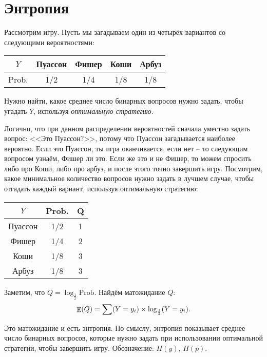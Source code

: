 \documentclass[10pt, a4paper]{extarticle}
\let\P\relax
\DeclareMathOperator{\P}{\mathbb{P}}
\DeclareMathOperator{\E}{\mathbb{E}}
\begin{document}
\hypertarget{entropy}{}
\section{Энтропия}
Рассмотрим игру. Пусть мы загадываем один из четырёх вариантов со следующими вероятностями:

\begin{center}
	\bgroup
	\def\arraystretch{1.5}
	\hspace*{-1.2cm}\begin{tabular}{ c| c c c c}
		$Y$ & Пуассон & Фишер & Коши & Арбуз \\
		\hline
		Prob. & 1/2 & 1/4 & 1/8 & 1/8
	\end{tabular}
	\egroup
\end{center}

Нужно найти, какое среднее число бинарных вопросов нужно задать, чтобы угадать $Y$, используя \textit{оптимальную стратегию}. 

Логично, что при данном распределении вероятностей сначала уместно задать вопрос: <<Это Пуассон?>>, потому что Пуассон загадывается наиболее вероятно. Если это Пуассон, ты игра оканчивается, если нет -- то следующим вопросом узнаём, Фишер ли это. Если же это и не Фишер, то можем спросить либо про Коши, либо про арбуз, и после этого точно завершить игру. Посмотрим, какое минимальное количество вопросов нужно задать в лучшем случае, чтобы отгадать каждый вариант, используя оптимальную стратегию:

\begin{center}
	\bgroup
	\def\arraystretch{1.5}
	\hspace*{-1.2cm}\begin{tabular}{c c c}
		$Y$ & Prob. & Q \\
		\hline
		Пуассон & 1/2 & 1 \\
		Фишер & 1/4 & 2 \\
		Коши & 1/8 & 3 \\
		Арбуз & 1/8 & 3 \\
	\end{tabular}
	\egroup
\end{center}

Заметим, что $Q = \log_{\frac{1}{2}}\text{Prob.}$ Найдём матожидание $Q$:
\[
\E(Q) = \sum \P(Y = y_i)\times \log_{\frac{1}{2}}\P(Y = y_i).
\]

Это матожидание и есть энтропия. По смыслу, энтропия показывает среднее число бинарных вопросов, которые нужно задать при использовании оптимальной стратегии, чтобы завершить игру. Обозначение: $H(y)$, $H(p)$.
\end{document}
